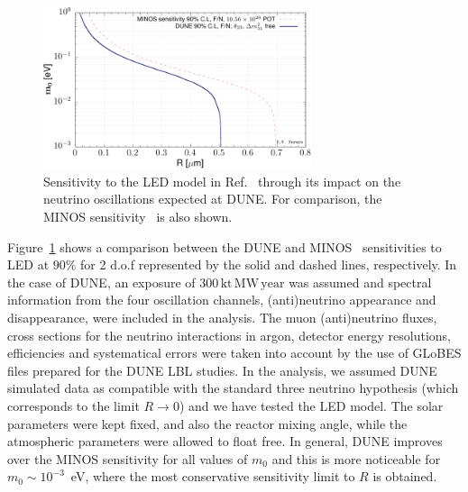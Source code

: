 \begin{figure}[ht]
\centerline{
\includegraphics[width=0.7\textwidth]{graphics/LED_sensitivity.pdf}
}
\caption[DUNE sensitivity to the LED model]{Sensitivity to the LED model in Ref.~\cite{Dienes:1998sb,ArkaniHamed:1998vp,Davoudiasl:2002fq} through its impact on the neutrino oscillations expected at 
DUNE. For comparison, the MINOS sensitivity~\cite{Adamson:2016yvy} is also shown.}
\label{fig:ledsensitivity}
\end{figure}

Figure~\ref{fig:ledsensitivity} shows a comparison between the DUNE and MINOS~\cite{Adamson:2016yvy} 
sensitivities to LED at $90\%$  for 2 d.o.f represented by the solid and dashed lines, respectively. 
In the case of DUNE, an exposure of $300\,\text{kt}\,\text{MW}\,\text{year}$ 
was assumed and spectral information from the four oscillation channels, (anti)neutrino 
appearance and disappearance, were included in the analysis. The muon (anti)neutrino 
fluxes, cross sections for the neutrino interactions in argon, detector energy 
resolutions, efficiencies and systematical errors were taken into account by the use of 
GLoBES files prepared for the DUNE LBL studies. In the analysis, we assumed DUNE 
simulated data as compatible with the standard three neutrino hypothesis (which corresponds to the limit $R\to 0$) and we have 
tested the LED model. The solar parameters were kept fixed, and also the reactor mixing 
angle, while the atmospheric parameters were allowed to float free. In general, DUNE 
improves over the MINOS sensitivity for all values of $m_0$ and this is more noticeable 
for $m_0\sim 10^{-3}$~eV, where the most conservative sensitivity limit to $R$ is 
obtained. 

